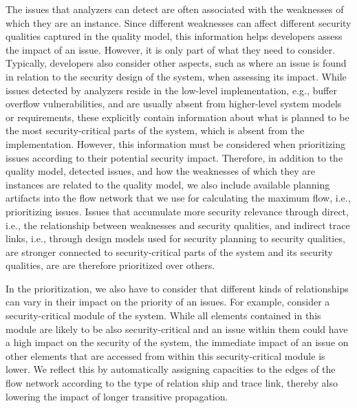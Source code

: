     The issues that analyzers can detect are often associated with the weaknesses of which they are an instance.
    Since different weaknesses can affect different security qualities captured in the quality model, this information helps developers assess the impact of an issue.
    However, it is only part of what they need to consider.
    Typically, developers also consider other aspects, such as where an issue is found in relation to the security design of the system, when assessing its impact.
	While issues detected by analyzers reside in the low-level implementation, e.g., buffer overflow vulnerabilities, and are usually absent from higher-level system models or requirements, these explicitly contain information about what is planned to be the most security-critical parts of the system, which is absent from the implementation.
	However, this information must be considered when prioritizing issues according to their potential security impact.
	Therefore, in addition to the quality model, detected issues, and how the weaknesses of which they are instances are related to the quality model, we also include available planning artifacts into the flow network that we use for calculating the maximum flow, i.e., prioritizing issues.
	Issues that accumulate more security relevance through direct, i.e., the relationship between weaknesses and security qualities, and indirect trace links, i.e., through design models used for security planning to security qualities, are stronger connected to security-critical parts of the system and its security qualities, are are therefore prioritized over others.

	In the prioritization, we also have to consider that different kinds of relationships can vary in their impact on the priority of an issues.
	For example, consider a security-critical module of the system.
	While all elements contained in this module are likely to be also security-critical and an issue within them could have a high impact on the security of the system, the immediate impact of an issue on other elements that are accessed from within this security-critical module is lower.
	We reflect this by automatically assigning capacities to the edges of the flow network according to the type of relation ship and trace link, thereby also lowering the impact of longer transitive propagation.

